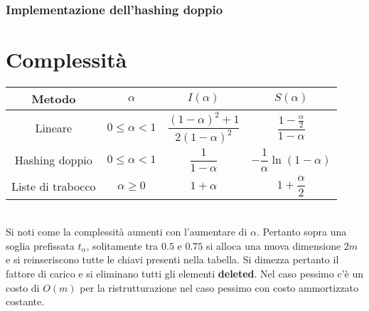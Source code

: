 \subsubsection{Implementazione dell'hashing doppio}

\section{Complessit\`a}
\begin{tabular}{c c c c}
\hline
\textbf{Metodo} & $\alpha$ & $I(\alpha)$ & $S(\alpha)$\\
\hline
Lineare & $0\le\alpha< 1$ & $\dfrac{(1-\alpha)^2+1}{2(1-\alpha)^2}$ & $\dfrac{1-\frac{\alpha}{2}}{1-\alpha}$\\
Hashing doppio & $0\le\alpha< 1$ & $\dfrac{1}{1-\alpha}$ & $-\dfrac{1}{\alpha}\ln(1-\alpha)$\\
Liste di trabocco & $\alpha\ge 0$ & $1+\alpha$ & $1+\dfrac{\alpha}{2}$\\
\hline
\end{tabular}\\
Si noti come la complessit\`a aumenti con l'aumentare di $\alpha$. Pertanto sopra una soglia prefissata $t_\alpha$, solitamente tra $0.5$ e $0.75$ si alloca
una nuova dimensione $2m$ e si reinseriscono tutte le chiavi presenti nella tabella. Si dimezza pertanto il fattore di carico e si eliminano tutti gli 
elementi \textbf{deleted}. Nel caso pessimo c'\`e un costo di $O(m)$ per la ristrutturazione nel caso pessimo con costo ammortizzato costante. 